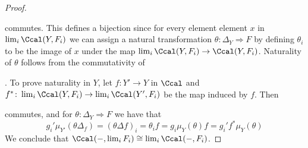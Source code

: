 \begin{solution}
\begin{proof}
        \begin{center}
        \end{center}
        commutes. This defines a bijection since for every element element $x$ in $\lim_i\Ccal(Y, F_i)$ we can assign a natural transformation $\theta\colon\Delta_Y\Rightarrow F$ by defining $\theta_i$ to be the image of $x$ under the map $\lim_i\Ccal(Y, F_i)\to\Ccal(Y, F_i)$.
        Naturality of $\theta$ follows from the commutativity of
        .
        To prove naturality in $Y$, let $f\colon Y'\to Y$ in $\Ccal$ and $f^*\colon\lim_i\Ccal(Y, F_i)\to \lim_i\Ccal(Y', F_i)$ be the map induced by $f$.
        Then
        \begin{center}
        \end{center}
        commutes, and for $\theta\colon\Delta_Y\Rightarrow F$ we have that
        \[ g_i'\mu_{Y'}(\theta\Delta_f)=(\theta\Delta f)_i=\theta_i f =g_i\mu_Y(\theta)f = g_i'f^*\mu_Y(\theta) \]
        We conclude that $\Ccal(-,\lim_i F_i)\cong\lim_i\Ccal(-, F_i)$.


\end{proof}
\end{solution}

